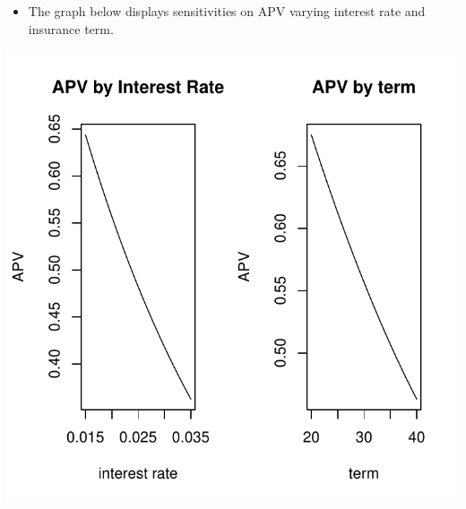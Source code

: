 \begin{frame}

\begin{itemize}[<+->]
\itemsep1pt\parskip0pt
\item
  The graph below displays sensitivities on APV varying interest rate
  and insurance term.
\end{itemize}

\begin{center}\includegraphics{introToLifecontingencies_files/figure-beamer/endowmentplot-1} \end{center}

\end{frame}

